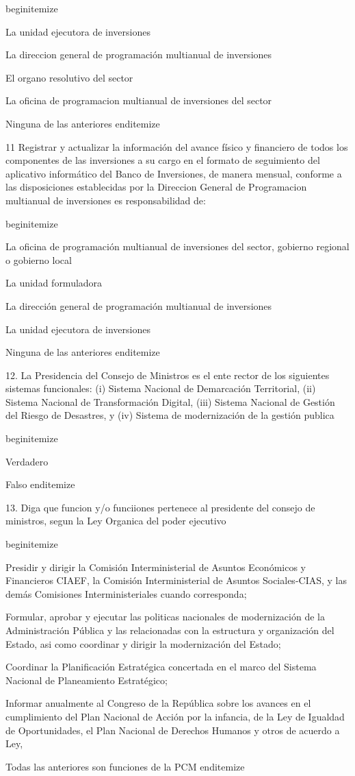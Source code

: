 begin{itemize}
			\item La unidad ejecutora de inversiones
 			\item La direccion general de programación multianual de inversiones 
			\item El organo resolutivo del sector
			\item La oficina de programacion multianual de inversiones del sector
			\item Ninguna de las anteriores
end{itemize}

11 Registrar y actualizar la información del avance físico y financiero de todos los componentes de las inversiones a su cargo en el formato de seguimiento del aplicativo informático del Banco de Inversiones, de manera mensual, conforme a las disposiciones establecidas por la Direccion General de Programacion multianual de inversiones es responsabilidad de:

begin{itemize}
			\item La oficina de programación multianual de inversiones del sector, gobierno regional o gobierno local
 			\item La unidad formuladora
			\item La dirección general de programación multianual de inversiones 
			\item La unidad ejecutora de inversiones 
			\item Ninguna de las anteriores 
end{itemize}


12. La Presidencia del Consejo de Ministros es el ente rector de los siguientes sistemas funcionales: (i) Sistema Nacional de Demarcación Territorial, (ii) Sistema Nacional de Transformación Digital, (iii) Sistema Nacional de Gestión del Riesgo de Desastres, y (iv) Sistema de modernización de la gestión publica

begin{itemize}
			\item Verdadero
 			\item Falso
end{itemize}


13. Diga que funcion y/o funciiones pertenece al presidente del consejo de ministros, segun la Ley Organica del poder ejecutivo

begin{itemize}
			\item Presidir y dirigir la Comisión Interministerial de Asuntos Económicos y Financieros CIAEF, la Comisión Interministerial de Asuntos Sociales-CIAS, y las demás Comisiones Interministeriales cuando corresponda;
 			\item Formular, aprobar y ejecutar las politicas nacionales de modernización de la Administración Pública y las relacionadas con la estructura y organización del Estado, asi como coordinar y dirigir la modernización del Estado;
			\item Coordinar la Planificación Estratégica concertada en el marco del Sistema Nacional de Planeamiento Estratégico;
			\item Informar anualmente al Congreso de la República sobre los avances en el cumplimiento del Plan Nacional de Acción por la infancia, de la Ley de Igualdad de Oportunidades, el Plan Nacional de Derechos Humanos y otros de acuerdo a Ley,
			\item Todas las anteriores son funciones de la PCM
end{itemize}


